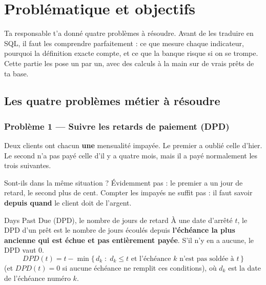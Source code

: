 \chapter{Problématique et objectifs}


Ta responsable t'a donné quatre problèmes à résoudre. Avant de les traduire en SQL, il faut les
comprendre parfaitement : ce que mesure chaque indicateur, pourquoi la définition exacte compte, et ce
que la banque risque si on se trompe. Cette partie les pose un par un, avec des calculs à la main sur
de vrais prêts de ta base.

\section{Les quatre problèmes métier à résoudre}

\subsection{Problème 1 --- Suivre les retards de paiement (DPD)}

\begin{imagine}
Deux clients ont chacun \textbf{une} mensualité impayée. Le premier a oublié celle d'hier. Le second
n'a pas payé celle d'il y a quatre mois, mais il a payé normalement les trois suivantes.

Sont-ils dans la même situation ? Évidemment pas : le premier a un jour de retard, le second plus de
cent. Compter les impayés ne suffit pas : il faut savoir \textbf{depuis quand} le client doit de
l'argent.
\end{imagine}

\begin{definition}{Days Past Due (DPD), le nombre de jours de retard}
À une date d'arrêté $t$, le DPD d'un prêt est le nombre de jours écoulés depuis \textbf{l'échéance la
plus ancienne qui est échue et pas entièrement payée}. S'il n'y en a aucune, le DPD vaut 0.
\[
DPD(t) = t - \min\{\, d_k \;:\; d_k \leq t \text{ et l'échéance } k \text{ n'est pas soldée à } t \,\}
\]
(et $DPD(t) = 0$ si aucune échéance ne remplit ces conditions),
où $d_k$ est la date de l'échéance numéro $k$.
\end{definition}

